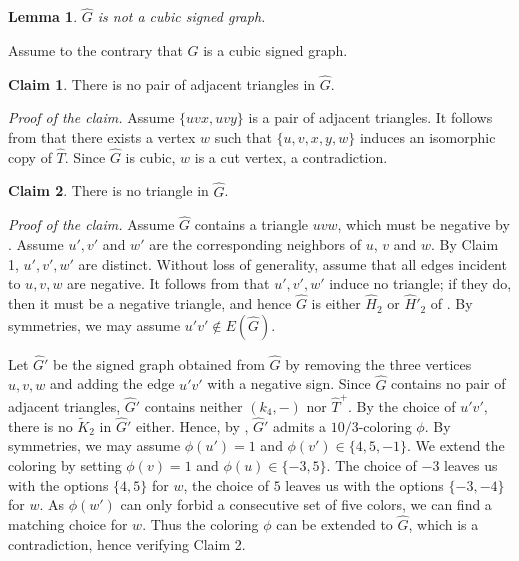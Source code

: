\documentclass[11pt,a4paper]{article}
\makeatletter
\renewenvironment{proof}[1][\proofname]{\par
	\pushQED{\qed}%
	\normalfont \topsep6\p@\@plus6\p@\relax
	\trivlist
	\item[\hskip\labelsep
	\bfseries
	#1\@addpunct{.}]\ignorespaces
}{%
	\popQED\endtrivlist\@endpefalse
}
\newtheorem{lemma}[theorem]{Lemma}
\theoremstyle{definition}
\newtheorem{claim}{Claim}
\makeatother
\begin{document}
	
\begin{lemma}\label{lem:Cubic}
	$\widehat{G}$ is not a cubic signed graph.
\end{lemma}
\begin{proof}
	Assume to the contrary that $\widehat{G}$ is a cubic signed graph. 
	
	\setcounter{claim}{0}
	
	\begin{claim}
		There is no pair of adjacent triangles in $\widehat{G}$.
	\end{claim}
	\noindent\emph{Proof of the claim.} Assume $\{uvx, uvy\}$ is a pair of adjacent triangles. It follows from   that there exists a vertex $w$ such that $\{u,v,x, y, w\}$ induces an isomorphic copy of $\widehat{T}$. Since $\widehat{G}$ is cubic, $w$ is a cut vertex, a contradiction. 
	
	
	\begin{claim}
		There is no triangle in $\widehat{G}$. 
	\end{claim}
	
	\noindent\emph{Proof of the claim.}
	Assume $\widehat{G}$ contains a triangle $uvw$, which must be negative by . Assume $u',v'$ and $w'$ are the corresponding neighbors of $u$, $v$ and $w$.  By Claim 1, $u', v', w'$ are distinct. Without loss of generality, assume that all edges incident to  $u,v,w$ are negative. It follows from   that $u',v',w'$ induce no triangle; if they do, then it must be a negative triangle, and hence $\widehat{G}$ is either $\widehat{H}_2$ or $\widehat{H}'_2$ of . By symmetries, we may assume $u'v'\notin E(\widehat{G})$. 
	
	
	
	Let $\widehat{G}'$ be the signed graph obtained from $\widehat{G}$ by removing the three vertices $u,v,w$ and adding the edge $u'v'$ with a negative sign. Since $\widehat{G}$ contains no pair of adjacent triangles, $\widehat{G}'$ contains neither $(k_4,-)$ nor $\widehat{T}^+$. By the choice of $u'v'$, there is no $\widetilde{K}_2$ in $\widehat{G}'$ either. Hence, by , $\widehat{G}'$ admits a $10/3$-coloring $\phi$. 	
	By symmetries, we may assume $\phi(u')=1$ and $\phi(v')\in \{4,5,-1\}$. We extend the coloring by setting $\phi(v)=1$ and $\phi(u)\in \{-3,5\}$. The choice of $-3$ leaves us with the options $\{4,5\}$ for $w$, the choice of $5$ leaves us with the options $\{-3,-4\}$ for $w$. As $\phi(w')$ can only forbid a consecutive set of five colors, we can find a matching choice for $w$. Thus the coloring $\phi$ can be extended to $\widehat{G}$, which is a contradiction, hence verifying Claim 2.
	

\end{proof}
\end{document}
